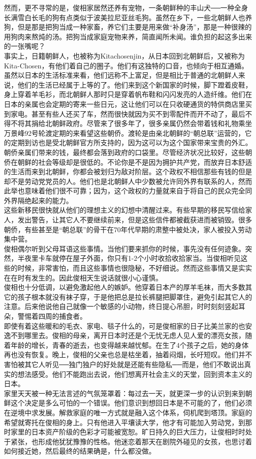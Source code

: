 然而，更不寻常的是，俊相家居然还养有宠物，一条朝鲜种的丰山犬──一种全身长满雪白长毛的狗有点类似于波美拉尼亚丝毛狗。虽然在乡下，一些北朝鲜人也养狗，但是那是把狗当成一种家畜，养它们主要是用来做“补身汤”，那是一种很辣的用狗肉来熬炖的汤。把狗当成家庭宠物来养，简直闻所未闻。谁负担的起这多出来的一张嘴呢？\\

事实上，日籍朝鲜人，也被称为Kitachosenjin，从日本回到北朝鲜后，又被称为Kita-Chosen，有他们着自己的圈子。他们有这独特的口音，也倾向于相互通婚。虽然以日本的生活标准来看，他们远称不上富足，但是相比于普通的北朝鲜人来说，他们的生活已经属于上等的了。他们来到这个新国家的时候，脚下蹬着皮鞋，身上穿着羊毛衫，而北朝鲜人那时只是穿着帆布鞋和闪闪发亮的人造纤维。他们在日本的亲属也会定期的寄来一些日元，这让他们可以在只收硬通货的特供商店里买到家电。甚至有些人还买了车，然而很快就因为买不到零配件而开不动了，最后不得不将其捐给北朝鲜政府。尽管来了很多年了，很多亲属仍然会带着钱和礼物乘坐万景峰92号轮渡定期的来看望这些朝侨。渡轮是由亲北朝鲜的“朝总联”运营的，它的定期到访也是受北朝鲜官方所支持的，因为这可以为这个国家带来宝贵的外汇。朝侨亲属们带来的钱，最终都会落到政府的口袋里。尽管经济状况比较好，这些朝侨在朝鲜的社会等级却是很低的。不论你是不是因为拥护共产党，而放弃日本舒适的生活而来到北朝鲜，你都会被划归为敌对阶层。这个政权不相信那些有钱的但是却不是劳动党党员的人。他们也是北朝鲜人中少数被允许同外界有联系的人，然而此举也意味着他们很不可靠；因为，这个政权的力量就来自于将自己的民众完全同外界隔绝起来的能力。\\

这些新移民很快就从他们的理想主义的幻想中清醒过来。有些早期的移民写信给家人，发出警告，让其它人不要继续前来，但是这些信件都被截获进而被销毁。很多朝侨，有些甚至是“朝总联”的骨干在70年代早期的肃整中被处决，家人被投入劳动集中营。\\

俊相偶尔听到父母耳语这些事情。当他们要来抓你的时候，事先没有任何迹象。突然，半夜里卡车就停在屋子外面，你只有1-2个小时收拾收拾家当。当俊相听见这些的时候，非常害怕，而且这些事情也很隐秘，不好细说。然而这些事情又是实实在在时有发生的。因此俊相天生说话就很小心谨慎。\\

俊相也十分低调，以避免激起他人的嫉妒。他穿着日本产的厚羊毛袜，而大多数其它的孩子根本就没有袜子穿，于是他把总是拉长裤腿把脚罩住，避免引起其它人的注意。后来他说他自己就像一个敏感的小动物，终日提心吊胆，时时刻刻竖起耳朵，警惕着四周的捕食者。\\

即使有着这些暖和的毛衣、家电、毯子什么的，可是俊相家的日子比美兰家的也安逸不到哪里去。俊相的母亲，离开日本时还是个无忧无虑人见人爱的漂亮女孩，随着年龄的增长，青春的逝去，也变得越来越忧郁。在生了4个孩子之后，她的身体再也没有恢复。晚上，俊相的父亲也总是枯坐着，抽着闷烟，长吁短叹。他们并不害怕被其它人听见──独门独户的好处就是还能有些隐私──而是，他们不敢说出真实的想法感受。他们不能跑出去说，他们想离开社会主义的天堂，回到资本主义的日本。\\

家里天天被一种无法言述的气氛笼罩着：每过去一天，就更深一步的认识到来到朝鲜这个决定是多么可怕的一个错误。他们意识到想回日本是不可能的了，他们必须在逆境中求发展。解救家庭的唯一方式就是融入这个体系，伺机爬到塔顶。家庭的希望就寄托在俊相的身上。只有他进入平壤读大学，他才有可能加入劳动党，到那时家里的日本资产阶级的色彩才可能被宽恕。旷日持久的巨大压力，让俊相时时处于紧张，也形成他犹犹豫豫的性格。他迷恋着那天在剧院外碰见的女孩，也思讨着如何接近她，然后最终的结果确是，什么都没做。\\
